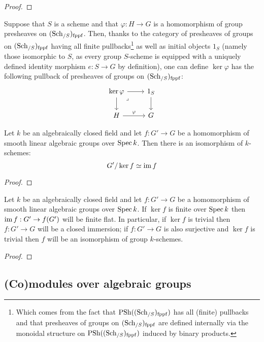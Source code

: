             \begin{proof}
                
            \end{proof}
        \begin{definition}[Kernels] \label{def: kernels_of_homomorphisms_of_group_schemes}
            Suppose that $S$ is a scheme and that $\varphi: H \to G$ is a homomorphism of group presheaves on $(\mathrm{Sch}_{/S})_{\mathrm{fppf}}$. Then, thanks to the category of presheaves of groups on $(\mathrm{Sch}_{/S})_{\mathrm{fppf}}$ having all finite pullbacks\footnote{Which comes from the fact that $\mathrm{PSh}((\mathrm{Sch}_{/S})_{\mathrm{fppf}})$ has all (finite) pullbacks and that presheaves of groups on $(\mathrm{Sch}_{/S})_{\mathrm{fppf}}$ are defined internally via the monoidal structure on $\mathrm{PSh}((\mathrm{Sch}_{/S})_{\mathrm{fppf}})$ induced by binary products.} as well as initial objects $1_S$ (namely those isomorphic to $S$, as every group $S$-scheme is equipped with a uniquely defined identity morphism $e: S \to G$ by definition), one can define $\ker \varphi$ has the following pullback of presheaves of groups on $(\mathrm{Sch}_{/S})_{\mathrm{fppf}}$:
                $$
                    \begin{tikzcd}
                        {\ker \varphi} & {1_S} \\
                        H & G
                        \arrow[from=1-2, to=2-2]
                        \arrow["\varphi", from=2-1, to=2-2]
                        \arrow[from=1-1, to=2-1]
                        \arrow[from=1-1, to=1-2]
                        \arrow["\lrcorner"{anchor=center, pos=0.125}, draw=none, from=1-1, to=2-2]
                    \end{tikzcd}
                $$
        \end{definition}
        \begin{corollary} \label{coro: first_isomorphism_theorem_for_linear_algebraic_groups}
            Let $k$ be an algebraically closed field and let $f: G' \to G$ be a homomorphism of smooth linear algebraic groups over $\operatorname{Spec} k$. Then there is an isomorphism of $k$-schemes:
                $$G'/\ker f \simeq \operatorname{im} f$$
        \end{corollary}
            \begin{proof}
                
            \end{proof}
        \begin{proposition} \label{prop: monomorphisms_between_linear_algebraic_groups}
            Let $k$ be an algebraically closed field and let $f: G' \to G$ be a homomorphism of smooth linear algebraic groups over $\operatorname{Spec} k$. If $\ker f$ is finite over $\operatorname{Spec} k$ then $\operatorname{im} f: G' \to f(G')$ will be finite flat. In particular, if $\ker f$ is trivial then $f: G' \to G$ will be a closed immersion; if $f: G' \to G$ is also surjective and $\ker f$ is trivial then $f$ will be an isomorphism of group $k$-schemes.
        \end{proposition}
            \begin{proof}
                
            \end{proof}

    \subsection{(Co)modules over algebraic groups}
        